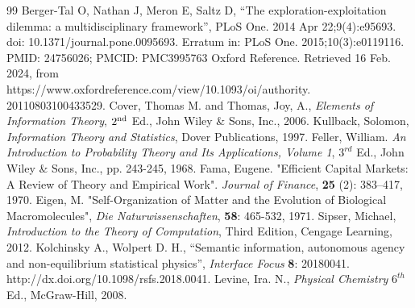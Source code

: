 \documentclass[11pt]{article}
\begin{document}
\begin{thebibliography}{99}
 Berger-Tal O, Nathan J, Meron E, Saltz D, ``The exploration-exploitation dilemma: a multidisciplinary framework'', PLoS One. 2014 Apr 22;9(4):e95693. doi: 10.1371/journal.pone.0095693. Erratum in: PLoS One. 2015;10(3):e0119116. PMID: 24756026; PMCID: PMC3995763
 Oxford Reference. Retrieved 16 Feb. 2024, from \\
https://www.oxfordreference.com/view/10.1093/oi/authority.
20110803100433529.
 Cover, Thomas M. and Thomas, Joy, A., {\it Elements of Information Theory}, $2^{\rm nd}$ Ed., John Wiley \& Sons, Inc., 2006.
 Kullback, Solomon, 	{\it Information Theory and Statistics}, Dover Publications, 1997.
 Feller, William.{ \it An Introduction to Probability Theory and Its Applications, Volume 1}, $3^{rd}$ Ed., John Wiley \& Sons, Inc., pp. 243-245, 1968.
 Fama, Eugene.  "Efficient Capital Markets: A Review of Theory and Empirical Work". {\it Journal of Finance}, \textbf{25} (2): 383–417, 1970.
 Eigen, M. "Self-Organization of Matter and the Evolution of Biological Macromolecules", {\it Die Naturwissenschaften}, \textbf{58}: 465-532, 1971.
 Sipser, Michael, {\it Introduction to the Theory of Computation}, Third Edition, Cengage Learning, 2012.
 Kolchinsky A., Wolpert D. H., ``Semantic information, autonomous agency and non-equilibrium statistical physics'', {\it Interface Focus} {\bf 8}: 20180041. http://dx.doi.org/10.1098/rsfs.2018.0041.
  Levine, Ira. N., {\it Physical Chemistry} $6^{th}$ Ed., McGraw-Hill, 2008.
\end{thebibliography}
\end{document}
